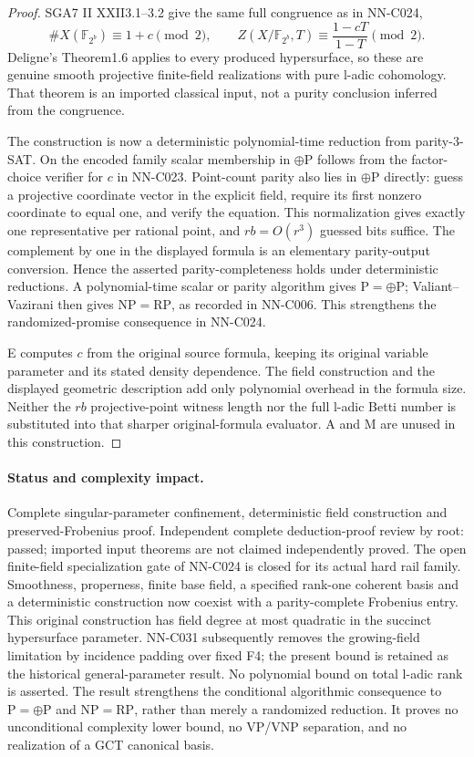 \begin{proof}
SGA7 II XXII3.1--3.2 give the same full congruence as in NN-C024,
\[
 \#X(\mathbb F_{2^b})\equiv1+c\pmod2,
 \qquad Z(X/\mathbb F_{2^b},T)\equiv\frac{1-cT}{1-T}\pmod2.
\]
Deligne's Theorem1.6 applies to every produced hypersurface, so these are genuine smooth projective finite-field realizations with pure l-adic cohomology. That theorem is an imported classical input, not a purity conclusion inferred from the congruence.

The construction is now a deterministic polynomial-time reduction from parity-3-SAT. On the encoded family scalar membership in $\oplus\mathrm P$ follows from the factor-choice verifier for $c$ in NN-C023. Point-count parity also lies in $\oplus\mathrm P$ directly: guess a projective coordinate vector in the explicit field, require its first nonzero coordinate to equal one, and verify the equation. This normalization gives exactly one representative per rational point, and $rb=O(r^3)$ guessed bits suffice. The complement by one in the displayed formula is an elementary parity-output conversion. Hence the asserted parity-completeness holds under deterministic reductions. A polynomial-time scalar or parity algorithm gives $\mathrm P=\oplus\mathrm P$; Valiant--Vazirani then gives $\mathrm{NP}=\mathrm{RP}$, as recorded in NN-C006. This strengthens the randomized-promise consequence in NN-C024.

E computes $c$ from the original source formula, keeping its original variable parameter and its stated density dependence. The field construction and the displayed geometric description add only polynomial overhead in the formula size. Neither the $rb$ projective-point witness length nor the full l-adic Betti number is substituted into that sharper original-formula evaluator. A and M are unused in this construction.
\end{proof}
\paragraph{Status and complexity impact.}
Complete singular-parameter confinement, deterministic field construction and preserved-Frobenius proof. Independent complete deduction-proof review by root: passed; imported input theorems are not claimed independently proved. The open finite-field specialization gate of NN-C024 is closed for its actual hard rail family. Smoothness, properness, finite base field, a specified rank-one coherent basis and a deterministic construction now coexist with a parity-complete Frobenius entry. This original construction has field degree at most quadratic in the succinct hypersurface parameter. NN-C031 subsequently removes the growing-field limitation by incidence padding over fixed F4; the present bound is retained as the historical general-parameter result. No polynomial bound on total l-adic rank is asserted. The result strengthens the conditional algorithmic consequence to $\mathrm P=\oplus\mathrm P$ and $\mathrm{NP}=\mathrm{RP}$, rather than merely a randomized reduction. It proves no unconditional complexity lower bound, no VP/VNP separation, and no realization of a GCT canonical basis.

